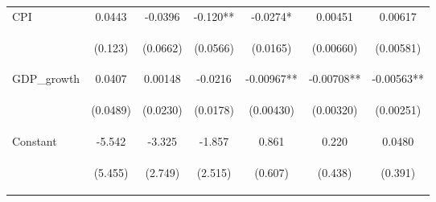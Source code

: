 \documentclass[]{article}
\begin{document}
\begin{center}
\begin{tabular}{lcccccc}
CPI & 0.0443 & -0.0396 & -0.120** & -0.0274* & 0.00451 & 0.00617 \\
\vspace{4pt} & \begin{footnotesize}(0.123)\end{footnotesize} & \begin{footnotesize}(0.0662)\end{footnotesize} & \begin{footnotesize}(0.0566)\end{footnotesize} & \begin{footnotesize}(0.0165)\end{footnotesize} & \begin{footnotesize}(0.00660)\end{footnotesize} & \begin{footnotesize}(0.00581)\end{footnotesize} \\
GDP\_growth & 0.0407 & 0.00148 & -0.0216 & -0.00967** & -0.00708** & -0.00563** \\
\vspace{4pt} & \begin{footnotesize}(0.0489)\end{footnotesize} & \begin{footnotesize}(0.0230)\end{footnotesize} & \begin{footnotesize}(0.0178)\end{footnotesize} & \begin{footnotesize}(0.00430)\end{footnotesize} & \begin{footnotesize}(0.00320)\end{footnotesize} & \begin{footnotesize}(0.00251)\end{footnotesize} \\
Constant & -5.542 & -3.325 & -1.857 & 0.861 & 0.220 & 0.0480 \\
 & \begin{footnotesize}(5.455)\end{footnotesize} & \begin{footnotesize}(2.749)\end{footnotesize} & \begin{footnotesize}(2.515)\end{footnotesize} & \begin{footnotesize}(0.607)\end{footnotesize} & \begin{footnotesize}(0.438)\end{footnotesize} & \begin{footnotesize}(0.391)\end{footnotesize} \\

\end{tabular}
\end{center}
\end{document}
